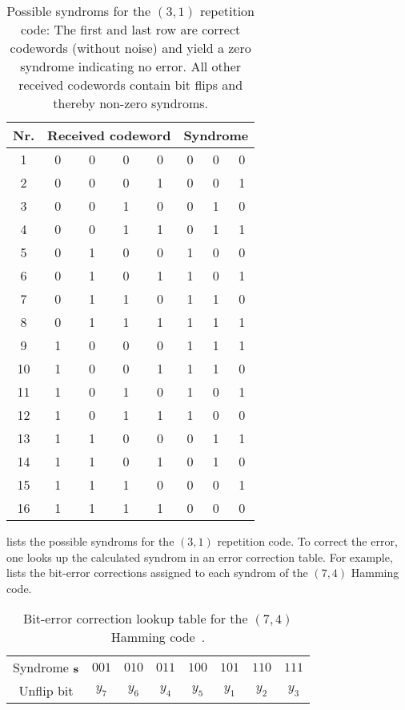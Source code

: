 \begin{table}[htb]
	\centering
	\begin{tabular}{c|cccc|ccc}
		\toprule
		Nr. & \multicolumn{4}{c}{Received codeword} & \multicolumn{3}{c}{Syndrome} \\
		\midrule
			1 & 0 & 0 & 0 & 0 & 0 & 0 & 0 \\
			2 & 0 & 0 & 0 & 1 & 0 & 0 & 1 \\
			3 & 0 & 0 & 1 & 0 & 0 & 1 & 0 \\
			4 & 0 & 0 & 1 & 1 & 0 & 1 & 1 \\
			5 & 0 & 1 & 0 & 0 & 1 & 0 & 0 \\
			6 & 0 & 1 & 0 & 1 & 1 & 0 & 1 \\
			7 & 0 & 1 & 1 & 0 & 1 & 1 & 0 \\
			8 & 0 & 1 & 1 & 1 & 1 & 1 & 1 \\
			9 & 1 & 0 & 0 & 0 & 1 & 1 & 1 \\
			10 & 1 & 0 & 0 & 1 & 1 & 1 & 0 \\
			11 & 1 & 0 & 1 & 0 & 1 & 0 & 1 \\
			12 & 1 & 0 & 1 & 1 & 1 & 0 & 0 \\
			13 & 1 & 1 & 0 & 0 & 0 & 1 & 1 \\
			14 & 1 & 1 & 0 & 1 & 0 & 1 & 0 \\
			15 & 1 & 1 & 1 & 0 & 0 & 0 & 1 \\
			16 & 1 & 1 & 1 & 1 & 0 & 0 & 0 \\
		\bottomrule
	\end{tabular}
	\caption{Possible syndroms for the $(3,1)$ repetition code: The first and last row are correct codewords (without noise) and yield a zero syndrome indicating no error. All other received codewords contain bit flips and thereby non-zero syndroms.}\label{tab:repetition_syndroms}
\end{table}
 lists the possible syndroms for the $(3,1)$ repetition code.
To correct the error, one looks up the calculated syndrom in an error correction table.
For example,  lists the bit-error corrections assigned to each syndrom of the $(7,4)$ Hamming code.
\begin{table}[htb]
	\centering
	\begin{tabular}{cccccccc}
		\toprule
		Syndrome $\vb{s}$ & $001$ & $010$ & $011$ & $100$ & $101$ & $110$ & $111$ \\
		Unflip bit & $y_7$ & $y_6$ & $y_4$ & $y_5$ & $y_1$ & $y_2$ & $y_3$ \\
		\bottomrule
	\end{tabular}
	\caption{Bit-error correction lookup table for the $(7,4)$ Hamming code~\cite[p.~11]{MacKay2003}.}\label{tab:hamming_correction}
\end{table}

